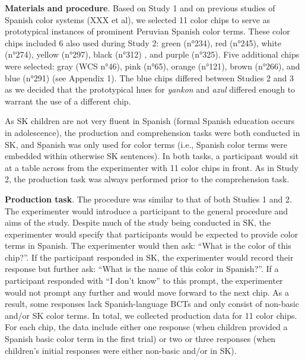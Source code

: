 \documentclass[
  english,
  ,man,floatsintext]{apa6}
\begin{document}
\textbf{Materials and procedure}. Based on Study 1 and on previous studies of Spanish color systems (XXX et al), we selected 11 color chips to serve as prototypical instances of prominent Peruvian Spanish color terms. These color chips included 6 also used during Study 2: green (n°234), red (n°245), white (n°274), yellow (n°297), black (n°312) , and purple (n°325). Five additional chips were selected: gray (WCS n°46), pink (n°65), orange (n°121), brown (n°266), and blue (n°291) (see Appendix 1). The blue chips differed between Studies 2 and 3 as we decided that the prototypical hues for \emph{yankon} and \emph{azul} differed enough to warrant the use of a different chip.

As SK children are not very fluent in Spanish (formal Spanish education occurs in adolescence), the production and comprehension tasks were both conducted in SK, and Spanish was only used for color terms (i.e., Spanish color terms were embedded within otherwise SK sentences). In both tasks, a participant would sit at a table across from the experimenter with 11 color chips in front. As in Study 2, the production task was always performed prior to the comprehension task.

\textbf{Production task}. The procedure was similar to that of both Studies 1 and 2. The experimenter would introduce a participant to the general procedure and aims of the study. Despite much of the study being conducted in SK, the experimenter would specify that participants would be expected to provide color terms in Spanish. The experimenter would then ask: \enquote{What is the color of this chip?}. If the participant responded in SK, the experimenter would record their response but further ask: \enquote{What is the name of this color in Spanish?}. If a participant responded with \enquote{I don't know} to this prompt, the experimenter would not prompt any further and would move forward to the next chip. As a result, some responses lack Spanish-language BCTs and only consist of non-basic and/or SK color terms. In total, we collected production data for 11 color chips. For each chip, the data include either one response (when children provided a Spanish basic color term in the first trial) or two or three responses (when children's initial responses were either non-basic and/or in SK).
\end{document}

